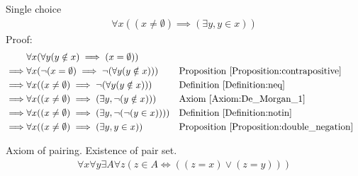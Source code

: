 \begin{prop}
Single choice
\begin{align*}
\forall x((x \neq \emptyset) \implies (\exists y, y \in x))
\end{align*}
Proof:
\begin{align*}
& \forall x (\forall y (y \notin x) \implies (x=\emptyset)) \\
\implies & \forall x ( \lnot(x=\emptyset) \implies \lnot (\forall y (y \notin x)) )
&& \text{Proposition \ref{Proposition:contrapositive}} \\
\implies & \forall x ( (x \neq \emptyset) \implies \lnot (\forall y (y \notin x)) )
&& \text{Definition \ref{Definition:neq}} \\
\implies & \forall x ( (x \neq \emptyset) \implies (\exists y, \lnot(y \notin x)) )
&& \text{Axiom \ref{Axiom:De_Morgan_1}} \\
\implies & \forall x ( (x \neq \emptyset) \implies (\exists y, \lnot( \lnot (y \in x))) )
&& \text{Definition \ref{Definition:notin}} \\
\implies & \forall x ( (x \neq \emptyset) \implies (\exists y, y \in x ))
&& \text{Proposition \ref{Proposition:double_negation}} \\
\end{align*}
\end{prop}

\begin{axm}
\label{Axiom:axiom_of_pairing}
Axiom of pairing. Existence of pair set.
\begin{align*}
\forall x \forall y \exists A \forall z (z \in A \iff ((z=x) \lor (z=y)))
\end{align*}
\end{axm}

